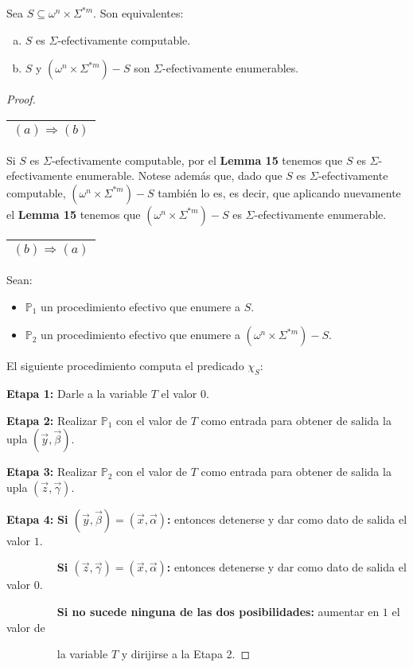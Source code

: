   \begin{theorem}
    \PN Sea $S \subseteq \omega^{n}\times \Sigma^{\ast m}$. Son equivalentes:

    \begin{enumerate}[a)]
      \item $S$ es $\Sigma$-efectivamente computable.
      \item $S$ y $(\omega^{n}\times \Sigma^{\ast m})-S$ son $\Sigma$-efectivamente enumerables.
    \end{enumerate}
  \end{theorem}
  \begin{proof}
    \begin{tabular}{|c|}\hline $(a) \Rightarrow (b)$\\\hline\end{tabular} Si $S$ es $\Sigma$-efectivamente computable,
    por el \textbf{Lemma 15} tenemos que $S$ es $\Sigma$-efectivamente enumerable. Notese además que, dado que $S$ es
    $\Sigma$-efectivamente computable, $(\omega^{n} \times \Sigma^{\ast m}) - S$ también lo es, es decir, que aplicando
    nuevamente el \textbf{Lemma 15} tenemos que $(\omega^{n} \times \Sigma^{\ast m})-S$ es
    $\Sigma$-efectivamente enumerable.

    \vspace{3mm}
    \begin{tabular}{|c|}\hline $(b) \Rightarrow (a)$\\\hline\end{tabular} Sean:

    \begin{itemize}
      \item $\mathbb{P}_{1}$ un procedimiento efectivo que enumere a $S$.
      \item $\mathbb{P}_{2}$ un procedimiento efectivo que enumere a $(\omega^{n}\times \Sigma^{\ast m}) - S$.
    \end{itemize}

    \PN El siguiente procedimiento computa el predicado $\chi_{S}$:

    \vspace{3mm}
    \textbf{Etapa 1:}
    Darle a la variable $T$ el valor $0$.

    \textbf{Etapa 2:}
    Realizar $\mathbb{P}_{1}$ con el valor de $T$ como entrada para obtener de salida la upla $(\vec{y}, \vec{\beta})$.

    \textbf{Etapa 3:}
    Realizar $\mathbb{P}_{2}$ con el valor de $T$ como entrada para obtener de salida la upla $(\vec{z}, \vec{\gamma})$.

    \textbf{Etapa 4:}
    \textbf{Si $(\vec{y}, \vec{\beta}) = (\vec{x}, \vec{\alpha})$:} entonces detenerse y dar como dato de salida el
    valor $1$.

    $\qquad\qquad\;\;$\textbf{Si $(\vec{z}, \vec{\gamma}) = (\vec{x}, \vec{\alpha})$:} entonces detenerse y dar como
    dato de salida el valor $0$.

    $\qquad\qquad\;\;$\textbf{Si no sucede ninguna de las dos posibilidades:} aumentar en $1$ el valor de

    $\qquad\qquad\;\;$la variable $T$ y dirijirse a la Etapa 2.
  \end{proof}

